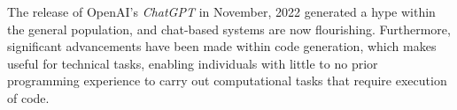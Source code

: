 \begin{comment}
Having a template to work from provides a starting point.
However, for a given project, a slight variation in the template may be required due to the nature of the given project.
Furthermore, the order in which the various chapters and sections will be written will also vary from project to project,
but the writing will seldom start at the abstract and sequentially follow the chapters of the report.
One critical reason for this is that you need to start writing as early as possible and that you will begin to write up where you are currently focusing.
However, do not leave working on the abstract until the very last days. The abstract is the first thing anyone reads of an article or thesis --- after the title;
and thus it is important that it is very well written. Abstracts are hard to write, so create revisions throughout the course of your project.

The background and motivation here should state where your project is situated in the field and what the key driving forces motivating this research are.
However, keep this section brief, as it is still part of the introduction.
The motivation will be further elaborated on in Chapter~\ref{cha:related_work}, presenting your complete state-of-the-art.

Note that this template uses italics to highlight where Latin wording is inserted to represent text and the text of the template
that we wish to draw your attention to. The italics themselves are not an indication that such sections should use italics.

\end{comment}

The release of OpenAI's \textit{ChatGPT} in November, 2022 \citep{openaiIntroducingChatGPT2022} generated a hype within the general population, and chat-based systems are now flourishing. Furthermore, significant advancements have been made within code generation, which makes  useful for technical tasks, enabling individuals with little to no prior programming experience to carry out computational tasks that require execution of code.

